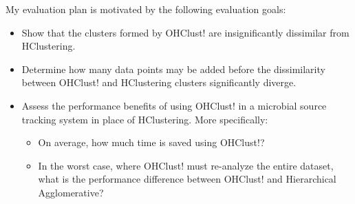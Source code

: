 \documentclass[12pt]{ucthesis}
\begin{document}
      My evaluation plan is motivated by the following evaluation goals:
      \begin{itemize}
         \item Show that the clusters formed by \textsf{OHClust!} are insignificantly
               dissimilar from HClustering.
         \item Determine how many data points may be added before the
               dissimilarity between \textsf{OHClust!} and HClustering clusters
               significantly diverge.
         \item Assess the performance benefits of using \textsf{OHClust!} in a
               microbial source tracking system in place of HClustering. More
               specifically:
               \begin{itemize}
                  \item On average, how much time is saved using \textsf{OHClust!}?
                  \item In the worst case, where \textsf{OHClust!} must re-analyze the
                        entire dataset, what is the performance difference
                        between \textsf{OHClust!} and Hierarchical Agglomerative?
               \end{itemize}
      \end{itemize}
\end{document}
